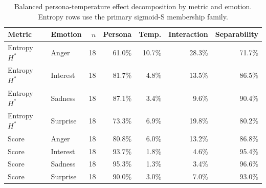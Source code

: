 \begin{table}[t]
\centering
\caption{Balanced persona-temperature effect decomposition by metric and emotion. Entropy rows use the primary sigmoid-S membership family.}
\label{tab:scis-effect-summary}
\begin{tabular}{llrrrrr}
\hline
Metric & Emotion & $n$ & Persona & Temp. & Interaction & Separability \\
\hline
Entropy $H^*$ & Anger & 18 & 61.0\% & 10.7\% & 28.3\% & 71.7\% \\
Entropy $H^*$ & Interest & 18 & 81.7\% & 4.8\% & 13.5\% & 86.5\% \\
Entropy $H^*$ & Sadness & 18 & 87.1\% & 3.4\% & 9.6\% & 90.4\% \\
Entropy $H^*$ & Surprise & 18 & 73.3\% & 6.9\% & 19.8\% & 80.2\% \\
Score & Anger & 18 & 80.8\% & 6.0\% & 13.2\% & 86.8\% \\
Score & Interest & 18 & 93.7\% & 1.8\% & 4.6\% & 95.4\% \\
Score & Sadness & 18 & 95.3\% & 1.3\% & 3.4\% & 96.6\% \\
Score & Surprise & 18 & 90.0\% & 3.0\% & 7.0\% & 93.0\% \\
\hline
\end{tabular}
\end{table}
